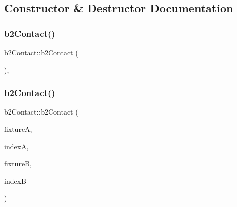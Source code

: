 \subsection{Constructor \& Destructor Documentation}
\mbox{\label{classb2_contact_a04b21bf6fcf41ba19866a2d57c4a2060}} 
\subsubsection{\texorpdfstring{b2Contact()}{b2Contact()}\hspace{0.1cm}{\footnotesize\ttfamily [1/2]}}
{\footnotesize\ttfamily b2\+Contact\+::b2\+Contact (\begin{DoxyParamCaption}{ }\end{DoxyParamCaption})\hspace{0.3cm}{\ttfamily [inline]}, {\ttfamily [protected]}}

\mbox{\label{classb2_contact_a2d1c98399cef1eb95c6ee8aad8257f60}} 
\subsubsection{\texorpdfstring{b2Contact()}{b2Contact()}\hspace{0.1cm}{\footnotesize\ttfamily [2/2]}}
{\footnotesize\ttfamily b2\+Contact\+::b2\+Contact (\begin{DoxyParamCaption}\item[{\mbox{\hyperlink{classb2_fixture}{b2\+Fixture}} $\ast$}]{fixtureA,  }\item[{\mbox{\hyperlink{b2_settings_8h_a43d43196463bde49cb067f5c20ab8481}{int32}}}]{indexA,  }\item[{\mbox{\hyperlink{classb2_fixture}{b2\+Fixture}} $\ast$}]{fixtureB,  }\item[{\mbox{\hyperlink{b2_settings_8h_a43d43196463bde49cb067f5c20ab8481}{int32}}}]{indexB }\end{DoxyParamCaption})\hspace{0.3cm}{\ttfamily [protected]}}

\mbox{\label{classb2_contact_a37368b233a5ac0d698310b300426ce16}} 
